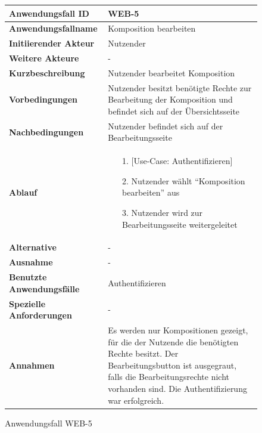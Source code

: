 \begin{figure}[h]
	\centering
	\begin{tabularx}{\textwidth}{ X | X }
		\textbf{Anwendungsfall ID} & WEB-5 \\ \hline
		\textbf{Anwendungsfallname} & Komposition bearbeiten \\ \hline
		\textbf{Initiierender Akteur} & Nutzender \\ \hline
		\textbf{Weitere Akteure} & - \\ \hline
		\textbf{Kurzbeschreibung} & Nutzender bearbeitet Komposition \\ \hline
		\textbf{Vorbedingungen} & Nutzender besitzt benötigte Rechte zur Bearbeitung der Komposition und befindet sich auf der Übersichtsseite \\ \hline
		\textbf{Nachbedingungen} & Nutzender befindet sich auf der Bearbeitungsseite \\ \hline
		\textbf{Ablauf} &
		\begin{enumerate}
			\item[1.] [Use-Case: Authentifizieren]
			\item[2.] Nutzender wählt ``Komposition bearbeiten'' aus
			\item[3.] Nutzender wird zur Bearbeitungsseite weitergeleitet
		\end{enumerate} \\ \hline
		\textbf{Alternative} & - \\ \hline
		\textbf{Ausnahme} & - \\ \hline
		\textbf{Benutzte Anwendungsfälle} & Authentifizieren \\ \hline
		\textbf{Spezielle Anforderungen} & - \\ \hline
		\textbf{Annahmen} & Es werden nur Kompositionen gezeigt, für die der Nutzende die benötigten Rechte besitzt.
                  Der Bearbeitungsbutton ist ausgegraut, falls die Bearbeitungsrechte nicht vorhanden sind. Die Authentifizierung war erfolgreich.
	\end{tabularx}
	\caption{Anwendungsfall WEB-5}
	\label{fig:anwendungsfall-server-tabelle-web-5}
\end{figure}

